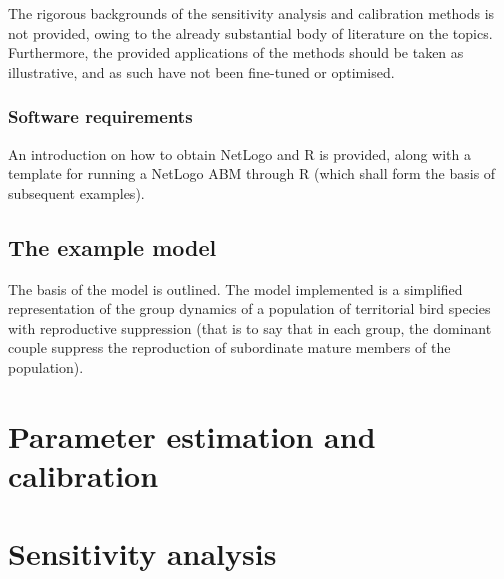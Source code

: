 The rigorous backgrounds of the sensitivity analysis and calibration methods is not provided, owing to the already substantial body of literature on the topics.
Furthermore, the provided applications of the methods should be taken as illustrative, and as such have not been fine-tuned or optimised.

\subsubsection{Software requirements}
\label{thiele:intro:software}

An introduction on how to obtain NetLogo and R is provided, along with a template for running a NetLogo ABM through R (which shall form the basis of subsequent examples).

\subsection{The example model}
\label{thiele:intro:example}

The basis of the model is outlined.
The model implemented is a simplified representation of the group dynamics of a population of territorial bird species with reproductive suppression (that is to say that in each group, the dominant couple suppress the reproduction of subordinate mature members of the population).

\section{Parameter estimation and calibration}
\label{thiele:parameter_estimation}

\section{Sensitivity analysis}
\label{thiele:sensitivity_analysis}

